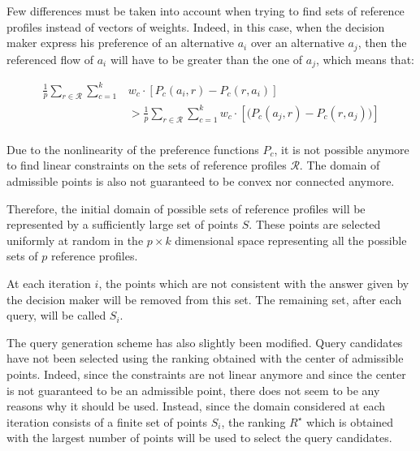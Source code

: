 Few differences must be taken into account when trying to find sets of reference profiles instead of vectors of weights.
Indeed, in this case, when the decision maker express his preference of an alternative $a_i$ over an alternative $a_j$, then the referenced flow of $a_i$ will have to be greater than the one of $a_j$, which means that:

\begin{equation}
    \begin{split}
        \frac{1}{p}\sum\limits_{r \in \mathcal{R}}\sum\limits^k_{c=1} & w_c \cdot \left[P_c(a_i,r) - P_c(r, a_i) \right] \\
        & > \frac{1}{p}\sum\limits_{r \in \mathcal{R}}\sum\limits^k_{c=1} w_c \cdot \left[ (P_c(a_j,r) - P_c(r, a_j)\big)\right] \\
    \end{split}
\end{equation}

Due to the nonlinearity of the preference functions $P_c$, it is not possible anymore to find linear constraints on the sets of reference profiles $\mathcal{R}$.
The domain of admissible points is also not guaranteed to be convex nor connected anymore.

Therefore, the initial domain of possible sets of reference profiles will be represented by a sufficiently large set of points $S$. These points are selected uniformly at random in the $p \times k$ dimensional space representing all the possible sets of $p$ reference profiles.

At each iteration $i$, the points which are not consistent with the answer given by the decision maker will be removed from this set.
The remaining set, after  each query, will be called $S_i$.

The query generation scheme has also slightly been modified.
Query candidates have not been selected using the ranking obtained with the center of admissible points.
Indeed, since the constraints are not linear anymore and since the center is not guaranteed to be an admissible point, there does not seem to be any reasons why it should be used.
Instead, since the domain considered at each iteration consists of a finite set of points $S_i$, the ranking $R^{\star}$ which is obtained with the largest number of points will be used to select the query candidates.


